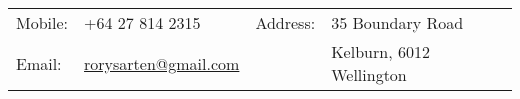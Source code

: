 \documentclass{article}[10pt] %
\begin{document}
\thispagestyle{empty}



{}


\vspace{20pt}

\hspace{5.5em}
\begin{minipage}{1\textwidth }
\color{soft}
  \begin{tabular}{llll}
Mobile: & +64 27 814 2315  & \quad \quad Address: & 35 Boundary Road \\
Email: & \href{mailto:rorysarten@gmail.com}{rorysarten@gmail.com} & \quad \quad &  Kelburn, 6012 Wellington \\
  \end{tabular}
\end{minipage}

\vspace{8pt}
\raggedright
\end{document}
